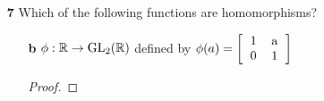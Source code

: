 \documentclass[paper=usletter, fontsize=12pt]{article}
\begin{document}
\begin{itemize}
\begin{enumerate}
\begin{proof}
                Let $a+bi,c+di \in \mathbb{C}^{\times}$\\
                Then $\phi((a+bi)(c+di))=(ac-bd)+i(ad+bc)$\\
                Therefore,
                \begin{align*}
                    \phi((a+bi)(c+di)) & = (ac-bd)+i(ad+bc)\\
                    & = (ac-bd)^2+(ad+bc)^2\\
                    & = (ac)^2-2acbd+(bd)^2+(ad)^2+2adbc+(bc)^2\\
                    & = (ac)^2+(bd)^2+(ad)^2+(bc)^2
                \end{align*}
                Also,
                \begin{align*}
                    \phi(a+bi)\phi(c+di) & = (a^2+b^2)(c^2+d^2)\\
                    & = a^2c^2+a^2d^2+b^2c^2+b^2d^2\\
                    & = (ac)^2+(bd)^2+(ad)^2+(bc)^2
                \end{align*}
                Therefore $\phi((a+bi)(c+di))=\phi(a+bi)\phi(c+di)$ \qedhere

            \end{proof}

            \item[\textbf{7}] Which of the following functions are
            homomorphisms?
            \begin{enumerate}

                \item[\textbf{b}] $\phi: \mathbb{R} \rightarrow \text{GL}_2(\mathbb{R})$ defined by $\phi(a)=\left[\begin{tabular}{cc}
                            1 & a \\
                            0 & 1
                \end{tabular}\right]$
                \begin{proof}


\end{proof}
\end{enumerate}
\end{enumerate}
\end{itemize}
\end{document}
